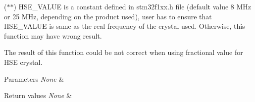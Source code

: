 ($\ast$$\ast$) H\+S\+E\+\_\+\+V\+A\+L\+UE is a constant defined in stm32f1xx.\+h file (default value 8 M\+Hz or 25 M\+Hz, depending on the product used), user has to ensure that H\+S\+E\+\_\+\+V\+A\+L\+UE is same as the real frequency of the crystal used. Otherwise, this function may have wrong result.


\begin{DoxyItemize}
\item The result of this function could be not correct when using fractional value for H\+SE crystal. 
\begin{DoxyParams}{Parameters}
{\em None} & \\
\hline
\end{DoxyParams}

\begin{DoxyRetVals}{Return values}
{\em None} & \\
\hline
\end{DoxyRetVals}

\end{DoxyItemize}
